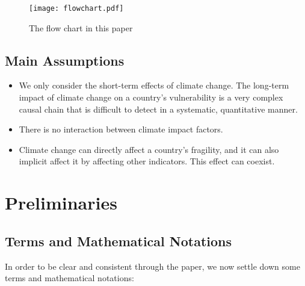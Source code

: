 \documentclass{mcmthesis}
\begin{document}
			\begin{figure}[h]
				\small
				\centering
				\texttt{[image: flowchart.pdf]}
				\caption{The flow chart in this paper}
				\label{fig:flowchart}
			\end{figure}

		
		\subsection{Main Assumptions}
		
			\begin{itemize}
				\item We only consider the short-term effects of climate change. The long-term impact of climate change on a country's vulnerability is a very complex causal chain that is difficult to detect in a systematic, quantitative manner.
				
				\item There is no interaction between climate impact factors.
				
				\item Climate change can directly affect a country's fragility, and it can also implicit affect it by affecting other indicators. This effect can coexist.
			\end{itemize}

	
	\section{Preliminaries}
		\subsection{Terms and Mathematical Notations}
		
		In order to be clear and consistent through the paper, we now settle down some terms	and mathematical notations:
		
\end{document}
